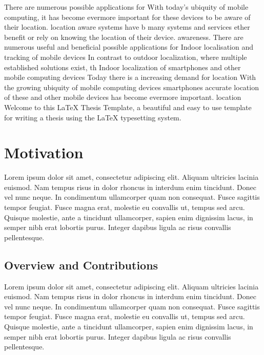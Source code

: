 There are numerous possible applications for
With today's ubiquity of mobile computing, it has become evermore important for these devices to be aware of their location. location aware systems have b many systems and services ether benefit or rely on knowing the location of their device. awareness.
There are numerous useful and beneficial possible applications for Indoor localisation and tracking of mobile devices  
In contrast to outdoor localization, where multiple established solutions exist, th
Indoor localization of smartphones and other mobile computing devices
Today there is a increasing demand for location 
With the growing ubiquity of mobile computing devices  smartphones accurate location of these and other mobile devices has become evermore important.  location Welcome to this \LaTeX{} Thesis Template, a beautiful and easy to use template for writing a thesis using the \LaTeX{} typesetting system.


\section{Motivation}

Lorem ipsum dolor sit amet, consectetur adipiscing elit. Aliquam ultricies lacinia euismod. Nam tempus risus in dolor rhoncus in interdum enim tincidunt. Donec vel nunc neque. In condimentum ullamcorper quam non consequat. Fusce sagittis tempor feugiat. Fusce magna erat, molestie eu convallis ut, tempus sed arcu. Quisque molestie, ante a tincidunt ullamcorper, sapien enim dignissim lacus, in semper nibh erat lobortis purus. Integer dapibus ligula ac risus convallis pellentesque.

\subsection{Overview and Contributions}

Lorem ipsum dolor sit amet, consectetur adipiscing elit. Aliquam ultricies lacinia euismod. Nam tempus risus in dolor rhoncus in interdum enim tincidunt. Donec vel nunc neque. In condimentum ullamcorper quam non consequat. Fusce sagittis tempor feugiat. Fusce magna erat, molestie eu convallis ut, tempus sed arcu. Quisque molestie, ante a tincidunt ullamcorper, sapien enim dignissim lacus, in semper nibh erat lobortis purus. Integer dapibus ligula ac risus convallis pellentesque.

